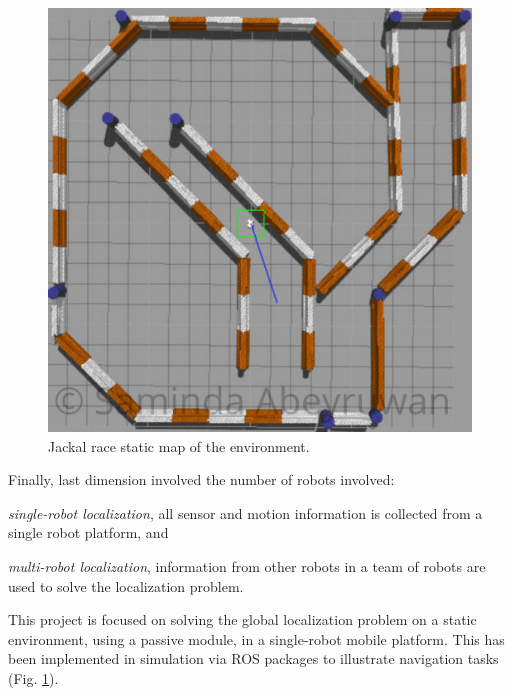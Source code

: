 \documentclass[10pt,journal,compsoc]{IEEEtran}
\begin{document}
\begin{figure}[thpb]
      \centering
      \includegraphics[width=\linewidth]{misc/map_w.png}
      \caption{Jackal race static map of the environment.}
      \label{fig:map}
\end{figure}

Finally, last dimension involved the number of robots involved: \begin{enumerate*} \item \textit{single-robot localization}, all sensor and motion information is collected from a single robot platform, and \item \textit{multi-robot localization}, information from other robots in a team of robots are used to solve the localization problem. \end{enumerate*}

This project is focused on solving the global localization problem on a static environment, using a passive module, in a single-robot mobile platform. This has been implemented in simulation via ROS \cite{288} packages to illustrate navigation tasks (Fig. \ref{fig:map}).  


\end{document}
